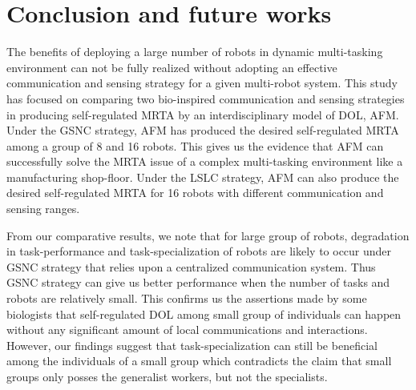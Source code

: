 \documentclass[journal]{IEEEtran}
\begin{document}
\section{Conclusion and future works}
\label{sec:conc}
The benefits of deploying a large number of robots in dynamic multi-tasking environment can not be fully realized without adopting an effective communication and sensing strategy for a given multi-robot system. This study has focused on comparing two bio-inspired  communication and sensing strategies in producing self-regulated MRTA by an interdisciplinary model of DOL, AFM. Under the GSNC strategy, AFM has produced the desired self-regulated MRTA among a group of 8 and 16 robots. This gives us the evidence that AFM can successfully solve the MRTA issue of a complex multi-tasking environment like a manufacturing shop-floor. Under the LSLC strategy, AFM can also produce the desired self-regulated MRTA for 16 robots with different communication and sensing ranges.

From our comparative results, we note that for large group of robots,  degradation in  task-performance and task-specialization of robots are likely to occur  under GSNC strategy that relies upon a centralized communication system. Thus GSNC strategy can give us better performance when the number of tasks and robots are relatively small. This confirms us the assertions made by some biologists that self-regulated DOL among small group of individuals can happen without any significant amount of local communications and interactions. However, our findings suggest that task-specialization can still be beneficial among the individuals of a small group which contradicts the claim that small groups only posses the generalist workers, but not the specialists.
\end{document}
